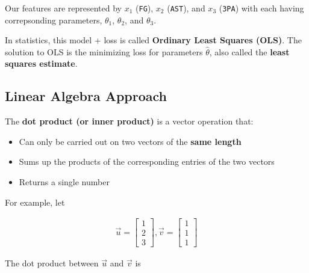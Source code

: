 \documentclass[
  letterpaper,
  DIV=11,
  numbers=noendperiod]{scrreprt}
\providecommand{\tightlist}{%
  \setlength{\itemsep}{0pt}\setlength{\parskip}{0pt}}\usepackage{longtable,booktabs,array}
\begin{document}
Our features are represented by \(x_1\) (\texttt{FG}), \(x_2\)
(\texttt{AST}), and \(x_3\) (\texttt{3PA}) with each having
correpsonding parameters, \(\theta_1\), \(\theta_2\), and \(\theta_3\).

In statistics, this model + loss is called \textbf{Ordinary Least
Squares (OLS)}. The solution to OLS is the minimizing loss for
parameters \(\hat{\theta}\), also called the \textbf{least squares
estimate}.

\subsection{Linear Algebra Approach}\label{linear-algebra-approach}

\begin{tcolorbox}[enhanced jigsaw, arc=.35mm, left=2mm, toprule=.15mm, leftrule=.75mm, bottomrule=.15mm, colframe=quarto-callout-tip-color-frame, rightrule=.15mm, colbacktitle=quarto-callout-tip-color!10!white, opacitybacktitle=0.6, coltitle=black, bottomtitle=1mm, colback=white, toptitle=1mm, title=\textcolor{quarto-callout-tip-color}{\faLightbulb}\hspace{0.5em}{Linear Algebra Review: Vector Dot Product}, breakable, opacityback=0, titlerule=0mm]

The \textbf{dot product (or inner product)} is a vector operation that:

\begin{itemize}
\tightlist
\item
  Can only be carried out on two vectors of the \textbf{same length}
\item
  Sums up the products of the corresponding entries of the two vectors
\item
  Returns a single number
\end{itemize}

For example, let

\begin{align}
\vec{u} = \begin{bmatrix}1 \\ 2 \\ 3\end{bmatrix}, \vec{v} = \begin{bmatrix}1 \\ 1 \\ 1\end{bmatrix}
\end{align}

The dot product between \(\vec{u}\) and \(\vec{v}\) is


\end{tcolorbox}
\end{document}
